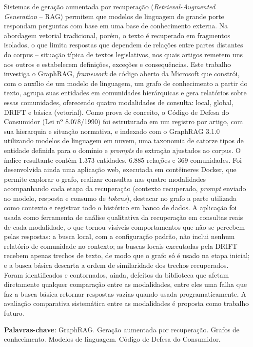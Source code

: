Sistemas de geração aumentada por recuperação (\textit{Retrieval-Augmented Generation} -- RAG) permitem que modelos de linguagem de grande porte respondam perguntas com base em uma base de conhecimento externa. Na abordagem vetorial tradicional, porém, o texto é recuperado em fragmentos isolados, o que limita respostas que dependem de relações entre partes distantes do corpus -- situação típica de textos legislativos, nos quais artigos remetem uns aos outros e estabelecem definições, exceções e consequências. Este trabalho investiga o GraphRAG, \textit{framework} de código aberto da Microsoft que constrói, com o auxílio de um modelo de linguagem, um grafo de conhecimento a partir do texto, agrupa suas entidades em comunidades hierárquicas e gera relatórios sobre essas comunidades, oferecendo quatro modalidades de consulta: local, global, DRIFT e básica (vetorial). Como prova de conceito, o Código de Defesa do Consumidor (Lei nº 8.078/1990) foi estruturado em um registro por artigo, com sua hierarquia e situação normativa, e indexado com o GraphRAG 3.1.0 utilizando modelos de linguagem em nuvem, uma taxonomia de catorze tipos de entidade definida para o domínio e \textit{prompts} de extração ajustados ao corpus. O índice resultante contém 1.373 entidades, 6.885 relações e 369 comunidades. Foi desenvolvida ainda uma aplicação web, executada em contêineres Docker, que permite explorar o grafo, realizar consultas nas quatro modalidades acompanhando cada etapa da recuperação (contexto recuperado, \textit{prompt} enviado ao modelo, resposta e consumo de \textit{tokens}), destacar no grafo a parte utilizada como contexto e registrar todo o histórico em banco de dados. A aplicação foi usada como ferramenta de análise qualitativa da recuperação em consultas reais de cada modalidade, o que tornou visíveis comportamentos que não se percebem pelas respostas: a busca local, com a configuração padrão, não inclui nenhum relatório de comunidade no contexto; as buscas locais executadas pela DRIFT recebem apenas trechos de texto, de modo que o grafo só é usado na etapa inicial; e a busca básica descarta a ordem de similaridade dos trechos recuperados. Foram identificados e contornados, ainda, defeitos da biblioteca que afetam diretamente qualquer comparação entre as modalidades, entre eles uma falha que faz a busca básica retornar respostas vazias quando usada programaticamente. A avaliação comparativa sistemática entre as modalidades é proposta como trabalho futuro.

\textbf{Palavras-chave}: GraphRAG. Geração aumentada por recuperação. Grafos de conhecimento. Modelos de linguagem. Código de Defesa do Consumidor.
